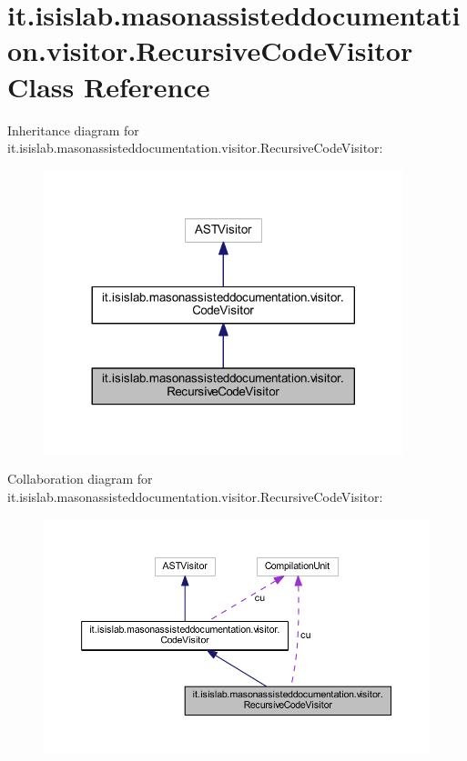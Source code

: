 \hypertarget{classit_1_1isislab_1_1masonassisteddocumentation_1_1visitor_1_1_recursive_code_visitor}{\section{it.\-isislab.\-masonassisteddocumentation.\-visitor.\-Recursive\-Code\-Visitor Class Reference}
\label{classit_1_1isislab_1_1masonassisteddocumentation_1_1visitor_1_1_recursive_code_visitor}
}


Inheritance diagram for it.\-isislab.\-masonassisteddocumentation.\-visitor.\-Recursive\-Code\-Visitor\-:
\nopagebreak
\begin{figure}[H]
\begin{center}
\leavevmode
\includegraphics[width=296pt]{classit_1_1isislab_1_1masonassisteddocumentation_1_1visitor_1_1_recursive_code_visitor__inherit__graph}
\end{center}
\end{figure}


Collaboration diagram for it.\-isislab.\-masonassisteddocumentation.\-visitor.\-Recursive\-Code\-Visitor\-:
\nopagebreak
\begin{figure}[H]
\begin{center}
\leavevmode
\includegraphics[width=350pt]{classit_1_1isislab_1_1masonassisteddocumentation_1_1visitor_1_1_recursive_code_visitor__coll__graph}
\end{center}
\end{figure}
